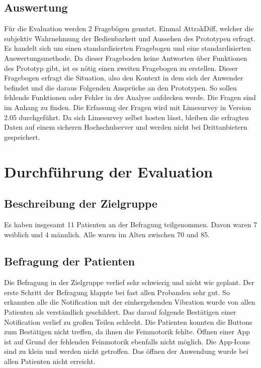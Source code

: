 \subsection{Auswertung}
Für die Evaluation werden 2 Fragebögen genutzt. Einmal AttrakDiff\cite{UserInDe:Attrakdiff}, welcher die subjektiv  Wahrnehmung der Bedienbarkeit und Aussehen des Prototypen erfragt. Es handelt sich um einen standardisierten Fragebogen und eine standardisierten Auswertungsmethode. Da dieser Frageboden keine Antworten über Funktionen des Prototyp gibt, ist es nötig einen zweiten Fragebogen zu erstellen. Dieser Fragebogen erfragt die Situation, also den Kontext in dem sich der Anwender befindet und die daraus Folgenden Ansprüche an den Prototypen. So sollen fehlende Funktionen oder Fehler in der Analyse aufdecken werde. Die Fragen sind im Anhang zu finden.
Die Erfassung der Fragen wird mit Limesurvey\cite{Limesurvey} in Version 2.05 durchgeführt. Da sich Limesurvey selbst hosten lässt, bleiben die erfragten Daten auf einem sicheren Hochschulserver und werden nicht bei Drittanbietern gespeichert. 

\section{Durchführung der Evaluation}
\subsection{Beschreibung der Zielgruppe}
Es haben insgesamt 11 Patienten  an der Befragung teilgenommen. Davon waren 7 weiblich und 4 männlich. Alle waren im Alten zwischen 70 und 85. 

\subsection{Befragung der Patienten}
Die Befragung in der Zielgruppe verlief sehr schwierig und nicht wie geplant.
Der erste Schritt der Befragung klappte bei fast allen Probanden sehr gut. So erkannten alle die Notification mit der einhergehenden Vibration wurde von allen Patienten als verständlich geschildert. Das darauf folgende Bestätigen einer Notification verlief zu großen Teilen schlecht. Die Patienten konnten die Buttons zum Bestätigen nicht treffen, da ihnen die Feinmotorik fehlte.
Öffnen einer App ist auf Grund der fehlenden Feinmotorik ebenfalls nicht möglich. Die App-Icons sind zu klein und werden nicht getroffen. Das öffnen der Anwendung wurde bei allen Patienten nicht erreicht.
